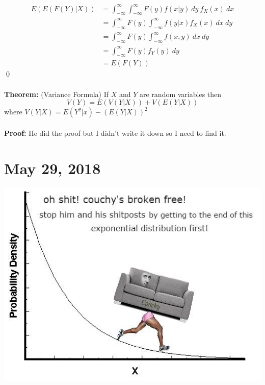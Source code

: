 \documentclass{article}
\newcommand{\thm}{\textbf{Theorem: }}
\newcommand{\proo}{\textbf{Proof: }}
\begin{document}
\begin{align*}
E(E(F(Y)|X)) &= \int_{-\infty}^{\infty} \int_{-\infty}^{\infty} F(y)f(x|y)\ dy\ f_{X}(x)\ dx\\
			&= \int_{-\infty}^{\infty} F(y) \int_{-\infty}^{\infty} f(y|x) f_{X}(x)\ dx\ dy\\
			&= \int_{-\infty}^{\infty} F(y) \int_{-\infty}^{\infty} f(x, y)\ dx\ dy\\
			&= \int_{-\infty}^{\infty} F(y)f_{Y}(y)\ dy\\
			&= E(F(Y))
\end{align*}
\qed\\\\
\thm (Variance Formula) If $X$ and $Y$ are random variables then
\[V(Y) = E(V(Y|X)) + V(E(Y|X))\]
where $V(Y|X) = E(Y^{2}|x) - (E(Y|X))^{2}$\\\\
\proo He did the proof but I didn't write it down so I need to find it.
\newpage


\section{May 29, 2018}
\newpage

\includegraphics[scale=0.6]{couchy.jpg}
\end{document}
